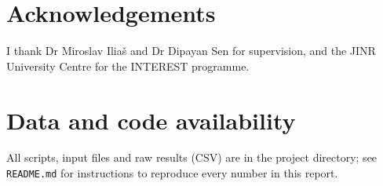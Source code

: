 \documentclass[11pt,a4paper]{article}
\begin{document}
\section*{Acknowledgements}
I thank Dr Miroslav Ilia\v{s} and Dr Dipayan Sen for supervision, and the JINR University Centre for the INTEREST programme.

\section*{Data and code availability}
All scripts, input files and raw results (CSV) are in the project directory; see \texttt{README.md} for instructions to reproduce every number in this report.



\end{document}
